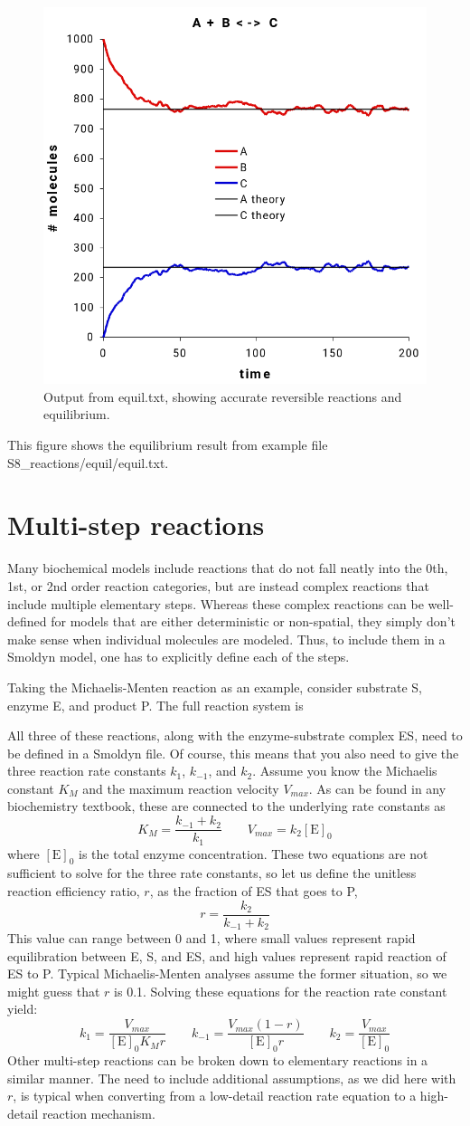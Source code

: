 \documentclass {book}
\begin{document}
\begin{figure}[h]
\centering
\includegraphics[height=5 cm]{figures/image45}
\caption{Output from equil.txt, showing accurate reversible reactions and equilibrium.}
\label{fig:equil}
\end{figure}

This figure shows the equilibrium result from example file S8\_reactions/equil/equil.txt.

\section{Multi-step reactions}

Many biochemical models include reactions that do not fall neatly into the 0th, 1st, or 2nd order reaction categories, but are instead complex reactions that include multiple elementary steps. Whereas these complex reactions can be well-defined for models that are either deterministic or non-spatial, they simply don't make sense when individual molecules are modeled. Thus, to include them in a Smoldyn model, one has to explicitly define each of the steps.

Taking the Michaelis-Menten reaction as an example, consider substrate S, enzyme E, and product P. The full reaction system is

All three of these reactions, along with the enzyme-substrate complex ES, need to be defined in a Smoldyn file. Of course, this means that you also need to give the three reaction rate constants $k_1$, $k_{-1}$, and $k_2$. Assume you know the Michaelis constant $K_M$ and the maximum reaction velocity $V_{max}$. As can be found in any biochemistry textbook, these are connected to the underlying rate constants as
$$K_M = \frac{k_{-1} + k_2}{k_1} \qquad V_{max} = k_2 [\textrm{E}]_0$$
where $[\textrm{E}]_0$ is the total enzyme concentration. These two equations are not sufficient to solve for the three rate constants, so let us define the unitless reaction efficiency ratio, $r$, as the fraction of ES that goes to P,
$$r=\frac{k_2}{k_{-1}+k_2}$$
This value can range between 0 and 1, where small values represent rapid equilibration between E, S, and ES, and high values represent rapid reaction of ES to P. Typical Michaelis-Menten analyses assume the former situation, so we might guess that $r$ is 0.1. Solving these equations for the reaction rate constant yield:
$$k_1 = \frac{V_{max}}{[\textrm{E}]_0 K_M r} \qquad k_{-1} = \frac{V_{max} (1-r)}{[\textrm{E}]_0 r} \qquad k_2 = \frac{V_{max}}{[\textrm{E}]_0}$$
Other multi-step reactions can be broken down to elementary reactions in a similar manner. The need to include additional assumptions, as we did here with $r$, is typical when converting from a low-detail reaction rate equation to a high-detail reaction mechanism.
\end{document}
